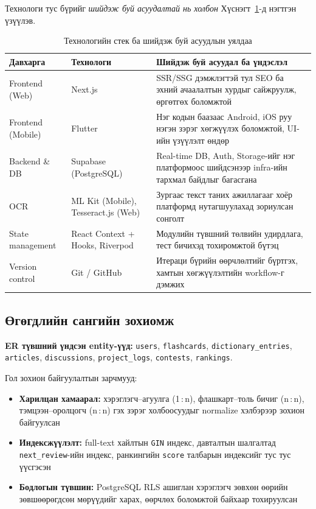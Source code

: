 Технологи тус бүрийг \textit{шийдэж буй асуудалтай нь холбон} Хүснэгт~\ref{tab:tech-stack}-д нэгтгэн үзүүлэв.

\begin{table}[H]
\centering
\caption{Технологийн стек ба шийдэж буй асуудлын уялдаа}
\label{tab:tech-stack}
\begin{tabular}{|p{3.2cm}|p{3.4cm}|p{7cm}|}
\hline
\textbf{Давхарга} & \textbf{Технологи} & \textbf{Шийдэж буй асуудал ба үндэслэл} \\ \hline
Frontend (Web) & Next.js & SSR/SSG дэмжлэгтэй тул SEO ба эхний ачаалалтын хурдыг сайжруулж, өргөтгөх боломжтой \\ \hline
Frontend (Mobile) & Flutter & Нэг кодын баазаас Android, iOS руу нэгэн зэрэг хөгжүүлэх боломжтой, UI-ийн үзүүлэлт өндөр \\ \hline
Backend \& DB & Supabase (PostgreSQL) & Real-time DB, Auth, Storage-ийг нэг платформоос шийдсэнээр infra-ийн тархмал байдлыг багасгана \\ \hline
OCR & ML Kit (Mobile), Tesseract.js (Web) & Зургаас текст таних ажиллагааг хоёр платформд нутагшуулахад зориулсан сонголт \\ \hline
State management & React Context + Hooks, Riverpod & Модулийн түвшний төлвийн удирдлага, тест бичихэд тохиромжтой бүтэц \\ \hline
Version control & Git / GitHub & Итераци бүрийн өөрчлөлтийг бүртгэх, хамтын хөгжүүлэлтийн workflow-г дэмжих \\ \hline
\end{tabular}
\end{table}

\subsection{Өгөгдлийн сангийн зохиомж}

\textbf{ER түвшний үндсэн entity-үүд:} \texttt{users}, \texttt{flashcards}, \texttt{dictionary\_entries}, \texttt{articles}, \texttt{discussions}, \texttt{project\_logs}, \texttt{contests}, \texttt{rankings}.

Гол зохион байгуулалтын зарчмууд:

\begin{itemize}
    \item \textbf{Харилцан хамаарал:} хэрэглэгч--агуулга (1\,:\,n), флашкарт--толь бичиг (n\,:\,n), тэмцээн--оролцогч (n\,:\,n) гэх зэрэг холбоосуудыг normalize хэлбэрээр зохион байгуулсан
    \item \textbf{Индексжүүлэлт:} full-text хайлтын \texttt{GIN} индекс, давталтын шалгалтад \texttt{next\_review}-ийн индекс, ранкингийн \texttt{score} талбарын индексийг тус тус үүсгэсэн
    \item \textbf{Бодлогын түвшин:} PostgreSQL RLS ашиглан хэрэглэгч зөвхөн өөрийн зөвшөөрөгдсөн мөрүүдийг харах, өөрчлөх боломжтой байхаар тохируулсан
\end{itemize}


